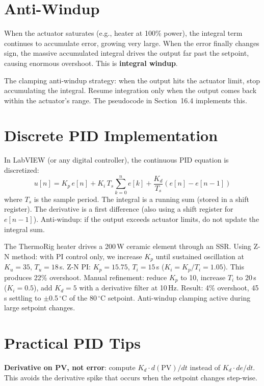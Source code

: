 \documentclass[11pt,letterpaper,twoside,openany]{book}
\newcommand{\degC}{\ensuremath{{}^{\circ}\text{C}}}
\begin{document}
\section{Anti-Windup}
When the actuator saturates (e.g., heater at 100\% power), the integral term continues to accumulate error, growing very large. When the error finally changes sign, the massive accumulated integral drives the output far past the setpoint, causing enormous overshoot. This is \textbf{integral windup}.

The clamping anti-windup strategy: when the output hits the actuator limit, stop accumulating the integral. Resume integration only when the output comes back within the actuator's range. The pseudocode in Section~16.4 implements this.

\section{Discrete PID Implementation}
In LabVIEW (or any digital controller), the continuous PID equation is discretized:
\begin{equation}
u[n] = K_p \, e[n] + K_i \, T_s \sum_{k=0}^{n} e[k] + \frac{K_d}{T_s}\left(e[n] - e[n-1]\right)
\end{equation}
where $T_s$ is the sample period. The integral is a running sum (stored in a shift register). The derivative is a first difference (also using a shift register for $e[n-1]$). Anti-windup: if the output exceeds actuator limits, do not update the integral sum.

\begin{examplebox}
The ThermoRig heater drives a 200\,W ceramic element through an SSR. Using Z-N method: with PI control only, we increase $K_p$ until sustained oscillation at $K_u = 35$, $T_u = 18$\,s. Z-N PI: $K_p = 15.75$, $T_i = 15$\,s ($K_i = K_p/T_i = 1.05$). This produces 22\% overshoot. Manual refinement: reduce $K_p$ to 10, increase $T_i$ to 20\,s ($K_i = 0.5$), add $K_d = 5$ with a derivative filter at 10\,Hz. Result: 4\% overshoot, 45\,s settling to $\pm$0.5\,\degC{} of the 80\,\degC{} setpoint. Anti-windup clamping active during large setpoint changes.
\end{examplebox}

\section{Practical PID Tips}
\textbf{Derivative on PV, not error}: compute $K_d \cdot d(\text{PV})/dt$ instead of $K_d \cdot de/dt$. This avoids the derivative spike that occurs when the setpoint changes step-wise.
\end{document}

